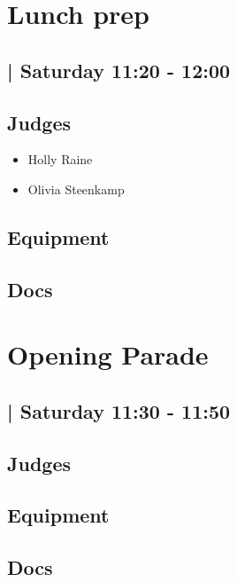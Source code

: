 \documentclass[10pt]{article}
\begin{document}
		\begin{minipage}{\linewidth}
		\setcounter{section}{18}
	\section{Lunch prep }
	\subsection*{ | Saturday 11:20 - 12:00}

	

	\begin{multicols}{2}
	\subsection*{\faUsers \: Judges}
	\begin{itemize}
			\item Holly Raine
			\item Olivia Steenkamp
		\end{itemize}
	\columnbreak
	\subsection*{\faWrench \: Equipment}
	        \vfill\null
        \subsection*{\faFile \: Docs}
     	\end{multicols}


	\vspace{1cm}
	\end{minipage}

		\begin{minipage}{\linewidth}
		\setcounter{section}{19}
	\section{Opening Parade }
	\subsection*{ | Saturday 11:30 - 11:50}

	

	\begin{multicols}{2}
	\subsection*{\faUsers \: Judges}
	\begin{itemize}
		\end{itemize}
	\columnbreak
	\subsection*{\faWrench \: Equipment}
	        \vfill\null
        \subsection*{\faFile \: Docs}
     	\end{multicols}


	\vspace{1cm}
	\end{minipage}
\end{document}
